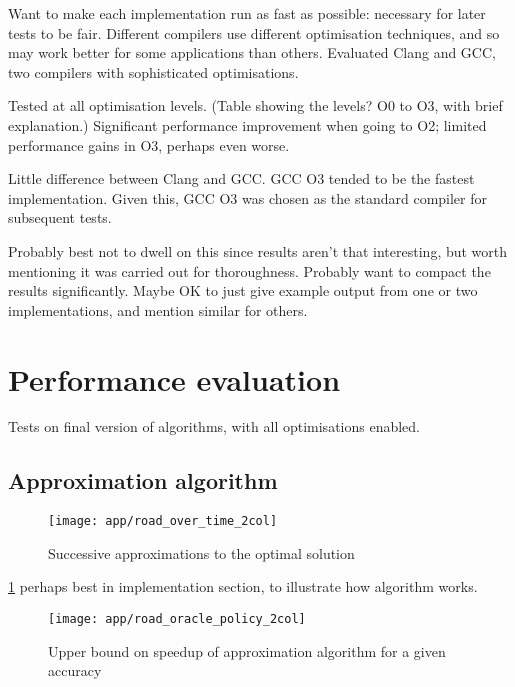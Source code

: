 Want to make each implementation run as fast as possible: necessary for later tests to be fair. Different compilers use different optimisation techniques, and so may work better for some applications than others. Evaluated Clang and GCC, two compilers with sophisticated optimisations.

Tested at all optimisation levels. (Table showing the levels? O0 to O3, with brief explanation.) Significant performance improvement when going to O2; limited performance gains in O3, perhaps even worse.

Little difference between Clang and GCC. GCC O3 tended to be the fastest implementation. Given this, GCC O3 was chosen as the standard compiler for subsequent tests.

Probably best not to dwell on this since results aren't that interesting, but worth mentioning it was carried out for thoroughness. Probably want to compact the results significantly. Maybe OK to just give example output from one or two implementations, and mention similar for others.

\section{Performance evaluation}

Tests on final version of algorithms, with all optimisations enabled.

\subsection{Approximation algorithm} \label{sec:eval-approx}


\begin{figure}
    \centering
    \texttt{[image: app/road\_over\_time\_2col]}
    \caption{Successive approximations to the optimal solution}
    \label{fig:app-cost-over-time}
\end{figure}

\cref{fig:app-cost-over-time} perhaps best in implementation section, to illustrate how algorithm works.

\begin{figure}
    \centering
    \texttt{[image: app/road\_oracle\_policy\_2col]}
    \caption{Upper bound on speedup of approximation algorithm for a given accuracy}
    \label{fig:app-oracle-policy}
\end{figure}

